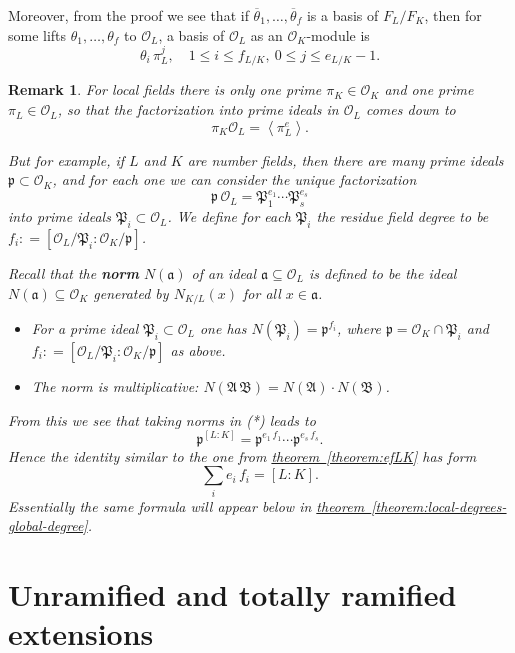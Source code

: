 \documentclass{article}
\newcommand{\term}{\textbf}
\newcommand{\dfn}{\mathrel{\mathop:}=}
\renewcommand{\O}{\mathcal{O}}
\newcommand{\refref}[2]{\hyperref[#2]{#1~\ref*{#2}}}
\theoremstyle{myplain}
\theoremstyle{mydefinition}
\newtheorem{remark}[proposition]{Remark}
\begin{document}
Moreover, from the proof we see that if
$\overline{\theta}_1, \ldots, \overline{\theta}_f$ is a basis of $F_L/F_K$, then
for some lifts $\theta_1, \ldots, \theta_f$ to $\O_L$, a basis of $\O_L$ as an
$\O_K$-module is
\[ \theta_i \, \pi_L^j, \quad 1 \le i \le f_{L/K}, ~ 0 \le j \le e_{L/K}-1. \]

\begin{remark}\label{remark:local-degrees-global-degree-number-fields}
  For local fields there is only one prime $\pi_K \in \O_K$ and one prime
  $\pi_L \in \O_L$, so that the factorization into prime ideals in $\O_L$ comes
  down to
  \[ \pi_K \O_L = \left<\pi_L^e\right>. \]

  But for example, if $L$ and $K$ are number fields, then there are many prime
  ideals $\mathfrak{p} \subset \O_K$, and for each one we can consider the
  unique factorization
  \[ \tag{*} \mathfrak{p}\,\O_L = \mathfrak{P}_1^{e_1} \cdots \mathfrak{P}_s^{e_s} \]
  into prime ideals $\mathfrak{P}_i \subset \O_L$. We define for each
  $\mathfrak{P}_i$ the residue field degree to be
  $f_i \dfn [\O_L / \mathfrak{P}_i : \O_K / \mathfrak{p}]$.

  Recall that the \term{norm} $N (\mathfrak{a})$ of an ideal
  $\mathfrak{a} \subseteq \O_L$ is defined to be the ideal
  $N (\mathfrak{a}) \subseteq \O_K$ generated by $N_{K/L} (x)$ for all
  $x \in \mathfrak{a}$.

  \begin{itemize}
  \item For a prime ideal $\mathfrak{P}_i \subset \O_L$ one has
    $N (\mathfrak{P}_i) = \mathfrak{p}^{f_i}$, where
    $\mathfrak{p} = \O_K\cap\mathfrak{P}_i$ and
    $f_i \dfn [\O_L/\mathfrak{P}_i : \O_K/\mathfrak{p}]$ as above.

  \item The norm is multiplicative:
    $N (\mathfrak{A}\,\mathfrak{B}) = N (\mathfrak{A}) \cdot N (\mathfrak{B})$.
  \end{itemize}

  From this we see that taking norms in (*) leads to
  \[ \mathfrak{p}^{[L:K]} = \mathfrak{p}^{e_1 \, f_1} \cdots \mathfrak{p}^{e_s \, f_s}. \]
  Hence the identity similar to the one from \refref{theorem}{theorem:efLK} has
  form
  \[ \sum_i e_i\,f_i = [L : K]. \]
  Essentially the same formula will appear below in
  \refref{theorem}{theorem:local-degrees-global-degree}.
\end{remark}

\section{Unramified and totally ramified extensions}
\end{document}
